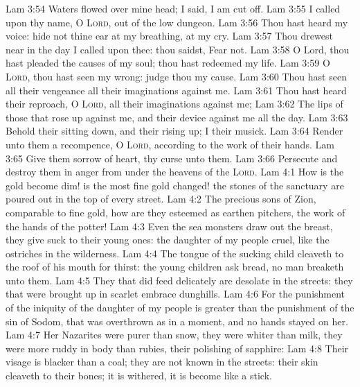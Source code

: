 \vs Lam 3:54 Waters flowed over mine head;  I said, I am cut off.
\vs Lam 3:55 I called upon thy name, O \textsc{Lord}, out of the low dungeon.
\vs Lam 3:56 Thou hast heard my voice: hide not thine ear at my breathing, at my cry.
\vs Lam 3:57 Thou drewest near in the day  I called upon thee: thou saidst, Fear not.
\vs Lam 3:58 O Lord, thou hast pleaded the causes of my soul; thou hast redeemed my life.
\vs Lam 3:59 O \textsc{Lord}, thou hast seen my wrong: judge thou my cause.
\vs Lam 3:60 Thou hast seen all their vengeance  all their imaginations against me.
\vs Lam 3:61 Thou hast heard their reproach, O \textsc{Lord},  all their imaginations against me;
\vs Lam 3:62 The lips of those that rose up against me, and their device against me all the day.
\vs Lam 3:63 Behold their sitting down, and their rising up; I  their musick.
\vs Lam 3:64 Render unto them a recompence, O \textsc{Lord}, according to the work of their hands.
\vs Lam 3:65 Give them sorrow of heart, thy curse unto them.
\vs Lam 3:66 Persecute and destroy them in anger from under the heavens of the \textsc{Lord}.
\vs Lam 4:1 How is the gold become dim!  is the most fine gold changed! the stones of the sanctuary are poured out in the top of every street.
\vs Lam 4:2 The precious sons of Zion, comparable to fine gold, how are they esteemed as earthen pitchers, the work of the hands of the potter!
\vs Lam 4:3 Even the sea monsters draw out the breast, they give suck to their young ones: the daughter of my people  cruel, like the ostriches in the wilderness.
\vs Lam 4:4 The tongue of the sucking child cleaveth to the roof of his mouth for thirst: the young children ask bread,  no man breaketh  unto them.
\vs Lam 4:5 They that did feed delicately are desolate in the streets: they that were brought up in scarlet embrace dunghills.
\vs Lam 4:6 For the punishment of the iniquity of the daughter of my people is greater than the punishment of the sin of Sodom, that was overthrown as in a moment, and no hands stayed on her.
\vs Lam 4:7 Her Nazarites were purer than snow, they were whiter than milk, they were more ruddy in body than rubies, their polishing  of sapphire:
\vs Lam 4:8 Their visage is blacker than a coal; they are not known in the streets: their skin cleaveth to their bones; it is withered, it is become like a stick.
